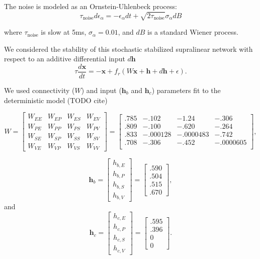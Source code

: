 \documentclass[11pt]{article}
\begin{document}
The noise is modeled as an Ornstein-Uhlenbeck process:
\begin{equation}
\tau_{\text{noise}} d\epsilon_\alpha = -\epsilon_\alpha dt + \sqrt{2\tau_{\text{noise}}}\sigma_\alpha dB
\end{equation}

where $\tau_{\text{noise}}$ is slow at 5ms, $\sigma_\alpha =  0.01 $, and $dB$ is a standard Wiener process.

We considered the stability of this stochastic stabilized supralinear network with respect to an additive differential input $d\mathbf{h}$
\begin{equation}
    \tau \frac{d\mathbf{x}}{dt} = -\mathbf{x} +f_r(W\mathbf{x} + \mathbf{h} + d\mathbf{h}+ \epsilon).
\end{equation}

We used connectivity ($W$) and input ($\mathbf{h}_b$ and $\mathbf{h}_c$) parameters fit to the deterministic model (TODO cite)

\begin{equation}
W =  \begin{bmatrix} W_{EE} & W_{EP} & W_{ES} & W_{EV} \\
W_{PE} & W_{PP} & W_{PS} & W_{PV} \\
W_{SE} & W_{SP} & W_{SS} & W_{SV} \\
W_{VE} & W_{VP} & W_{VS} & W_{VV}  \end{bmatrix} = 
 \begin{bmatrix} .785 & -.102 & -1.24 & -.306 \\
.809 & -.100 & -.620 & -.264 \\
.833 & -.000128 & -.0000483 & -.742 \\
.708 & -.306 & -.452 & -.0000605 \\
 \end{bmatrix},
\end{equation} 

\begin{equation}
\mathbf{h}_b =  \begin{bmatrix} h_{b,E} \\ h_{b,P} \\ h_{b,S} \\ h_{b,V} \end{bmatrix} =
 \begin{bmatrix} .590 \\ .504 \\ .515 \\ .670 \end{bmatrix} ,
\end{equation} 
and
\begin{equation} 
\mathbf{h}_c = \begin{bmatrix} h_{c,E} \\ h_{c,P} \\ h_{c,S} \\ h_{c,V} \end{bmatrix} = 
\begin{bmatrix} .595 \\ .396 \\ 0 \\ 0 \end{bmatrix}.
\end{equation} 
\end{document}
